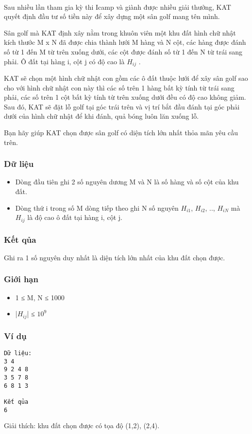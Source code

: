 

 

Sau nhiều lần tham gia kỳ thi Icamp và giành được nhiều giải thưởng, KAT quyết định đầu tư số tiền này để xây dựng một sân golf mang tên mình.

Sân golf mà KAT định xây nằm trong khuôn viên một khu đất hình chữ nhật kích thước M x N đã được chia thành lưới M hàng và N cột, các hàng được đánh số từ 1 đến M từ trên xuống dưới, các cột được đánh số từ 1 đến N từ trái sang phải. Ô đất tại hàng i, cột j có độ cao là $H_{ij}$ .

KAT sẽ chọn một hình chữ nhật con gồm các ô đất thuộc lưới để xây sân golf sao cho với hình chữ nhật con này thì các số trên 1 hàng bất kỳ tính từ trái sang phải, các số trên 1 cột bất kỳ tính từ trên xuống dưới đều có độ cao không giảm. Sau đó, KAT sẽ đặt lỗ golf tại góc trái trên và vị trí bắt đầu đánh tại góc phải dưới của hình chữ nhật để khi đánh, quả bóng luôn lăn xuống lỗ.

Bạn hãy giúp KAT chọn được sân golf có diện tích lớn nhất thỏa mãn yêu cầu trên.

\subsubsection{Dữ liệu}
\begin{itemize}
	\item Dòng đầu tiên ghi 2 số nguyên dương M và N là số hàng và số cột của khu đất.
	\item Dòng thứ i trong số M dòng tiếp theo ghi N số nguyên $H_{i1}$, $H_{i2}$, .., $H_{iN}$ mà $H_{ij}$ là độ cao ô đất tại hàng i, cột j.
\end{itemize}

\subsubsection{Kết qủa}

Ghi ra 1 số nguyên duy nhất là diện tích lớn nhất của khu đất chọn được.

\subsubsection{Giới hạn}
\begin{itemize}
	\item 1 ≤ M, N ≤ 1000
	\item |$H_{ij}$| ≤ $10^{9}$
\end{itemize}

\subsubsection{Ví dụ}
\begin{verbatim}
Dữ liệu:
3 4
9 2 4 8
3 5 7 8
6 8 1 3

Kết qủa
6
\end{verbatim}

Giải thích: khu đất chọn được có tọa độ (1,2), (2,4).
